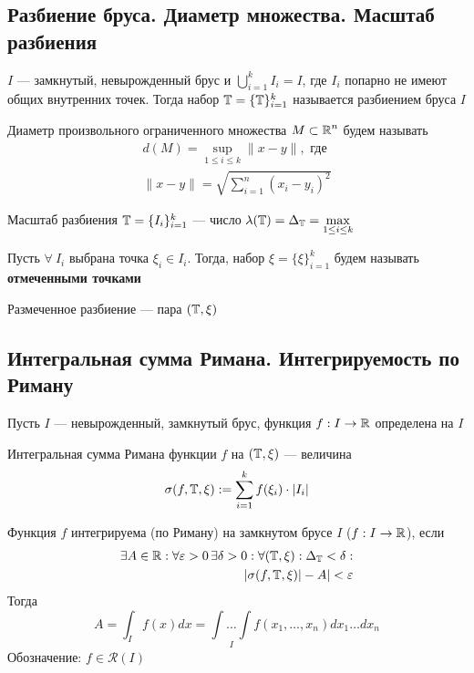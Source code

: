 \documentclass[a4paper, 10pt]{article}
\begin{document}
\subsection{Разбиение бруса. Диаметр множества. Масштаб разбиения}
 \label{1.3} $I$ — замкнутый, невырожденный брус и $\displaystyle\bigcup_{i=1}^kI_i = I$, где $I_i$ попарно не имеют общих внутренних точек. Тогда набор $\operatorname{\mathbb{T}} = \{\operatorname{\mathbb{T}}\}_{i=1}^k$ называется разбиением бруса $I$

 \label{1.4} Диаметр произвольного ограниченного множества $M\subset\operatorname{\mathbb{R}}^n$ будем называть 
\begin{equation*}
\begin{aligned}
    d(M) = \displaystyle\sup_{1\leqslant i\leqslant k}\|x-y\|,\text{ где}\\
    \|x-y\|=\sqrt{\sum_{i=1}^{n}\left(x_i-y_i\right)^2}
\end{aligned}
\end{equation*}

 \label{1.5} Масштаб разбиения $\operatorname{\mathbb{T}}=\{I_i\}_{i=1}^k$ — число $\lambda(\operatorname{\mathbb{T}}) = \Delta_{\operatorname{\mathbb{T}}} = \displaystyle\max_{1\le i\le k}$

 \label{1.6} Пусть $\forall\ I_i$ выбрана точка $\xi_i\in I_i$. Тогда, набор $\xi = \{\xi\}_{i=1}^k$ будем называть \textbf{отмеченными точками}

 \label{1.7} Размеченное разбиение — пара $(\operatorname{\mathbb{T}}, \xi)$

\subsection{Интегральная сумма Римана. Интегрируемость по Риману}
Пусть $I$ — невырожденный, замкнутый брус, функция $f: I\rightarrow \operatorname{\mathbb{R}}$ определена на $I$

 \label{1.8} Интегральная сумма Римана функции $f$ на $(\operatorname{\mathbb{T}}, \xi)$ — величина
$$\sigma(f, \T, \xi) := \sum_{i=1}^kf(\xi_i)\cdot|I_i|$$

 \label{1.9} Функция $f$ интегрируема (по Риману) на замкнутом брусе $I$ ($f:I\rightarrow\operatorname{\mathbb{R}}$), если 
\begin{equation*}
\begin{aligned}
    \exists A\in\operatorname{\mathbb{R}}: \forall \varepsilon > 0\, \exists \delta > 0: \forall(\operatorname{\mathbb{T}}, \xi): \Delta_{\operatorname{\mathbb{T}}} < \delta:\\
    |\sigma(f, \operatorname{\mathbb{T}}, \xi)| - A| < \varepsilon
\end{aligned}
\end{equation*}
Тогда 
$$A = \int_If(x)dx = \underset{I}{\int\ldots\int}f(x_1, \ldots, x_n)dx_1\ldots dx_n$$
Обозначение: $f\in\mathcal{R}(I)$
\end{document}
